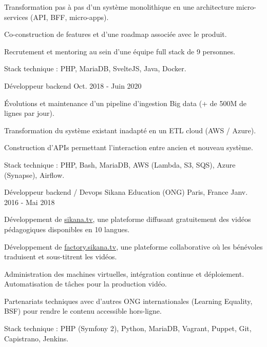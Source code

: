 \begin{cventries}
{\begin{cvitems}
        \item {Transformation pas à pas d'un système monolithique en une architecture micro-services (API, BFF, micro-apps).}
        \item {Co-construction de features et d'une roadmap associée avec le produit.}
        \item {Recrutement et mentoring au sein d'une équipe full stack de 9 personnes.}
        \item {Stack technique : PHP, MariaDB, SvelteJS, Java, Docker.}
      \end{cvitems}
      \vspace{-2.0mm}
    }
  \cventry
    {Développeur backend}
    {}
    {}
    {Oct. 2018 - Juin 2020}
    {
      \begin{cvitems}
        \item {Évolutions et maintenance d'un pipeline d'ingestion Big data (+ de 500M de lignes par jour).}
        \item {Transformation du système existant inadapté en un ETL cloud (AWS / Azure).}
        \item {Construction d'APIs permettant l'interaction entre ancien et nouveau système.}
        \item {Stack technique : PHP, Bash, MariaDB, AWS (Lambda, S3, SQS), Azure (Synapse), Airflow.}
      \end{cvitems}
    }
  \cventry
    {Développeur backend / Devops}
    {Sikana Education (ONG)}
    {Paris, France}
    {Janv. 2016 - Mai 2018}
    {
      \begin{cvitems}
        \item {Développement de \href{https://sikana.tv}{sikana.tv}, une plateforme diffusant gratuitement des vidéos pédagogiques disponibles en 10 langues.}
        \item {Développement de \href{https://factory.sikana.tv}{factory.sikana.tv}, une plateforme collaborative où les bénévoles traduisent et sous-titrent les vidéos.}
        \item {Administration des machines virtuelles, intégration continue et déploiement. Automatisation de tâches pour la production vidéo.}
        \item {Partenariats techniques avec d'autres ONG internationales (Learning Equality, BSF) pour rendre le contenu accessible hors-ligne.}
        \item {Stack technique : PHP (Symfony 2), Python, MariaDB, Vagrant, Puppet, Git, Capistrano, Jenkins.}

\end{cvitems}}
\end{cventries}
